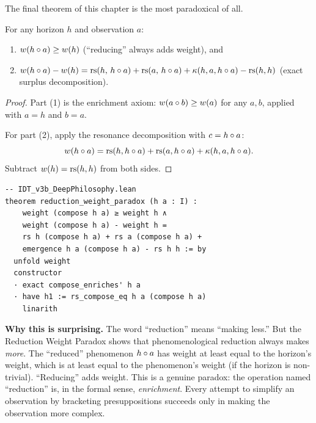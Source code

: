 The final theorem of this chapter is the most paradoxical of all.

\begin{theorem}
\label{thm:reduction-weight-paradox}
For any horizon $h$ and observation $a$:
\begin{enumerate}
\item $w(h \circ a) \geq w(h)$
\hfill (``reducing'' always adds weight), and
\item $w(h \circ a) - w(h) = \mathrm{rs}(h,\, h \circ a) +
\mathrm{rs}(a,\, h \circ a) + \kappa(h, a, h \circ a) - \mathrm{rs}(h, h)$
\hfill (exact surplus decomposition).
\end{enumerate}
\end{theorem}

\begin{proof}
Part (1) is the enrichment axiom: $w(a \circ b) \geq w(a)$ for any
$a, b$, applied with $a = h$ and $b = a$.

For part (2), apply the resonance decomposition with
$c = h \circ a$:
\[
w(h \circ a) = \mathrm{rs}(h, h \circ a) + \mathrm{rs}(a, h \circ a)
+ \kappa(h, a, h \circ a).
\]
Subtract $w(h) = \mathrm{rs}(h, h)$ from both sides.
\end{proof}

\begin{lstlisting}
-- IDT_v3b_DeepPhilosophy.lean
theorem reduction_weight_paradox (h a : I) :
    weight (compose h a) ≥ weight h ∧
    weight (compose h a) - weight h =
    rs h (compose h a) + rs a (compose h a) +
    emergence h a (compose h a) - rs h h := by
  unfold weight
  constructor
  · exact compose_enriches' h a
  · have h1 := rs_compose_eq h a (compose h a)
    linarith
\end{lstlisting}

\begin{surprisebox}
\textbf{Why this is surprising.} The word ``reduction'' means
``making less.'' But the Reduction Weight Paradox shows that
phenomenological reduction always makes \emph{more}. The ``reduced''
phenomenon $h \circ a$ has weight at least equal to the horizon's
weight, which is at least equal to the phenomenon's weight (if the
horizon is non-trivial). ``Reducing'' adds weight. This is a genuine
paradox: the operation named ``reduction'' is, in the formal sense,
\emph{enrichment}. Every attempt to simplify an observation by
bracketing presuppositions succeeds only in making the observation
more complex.
\end{surprisebox}

